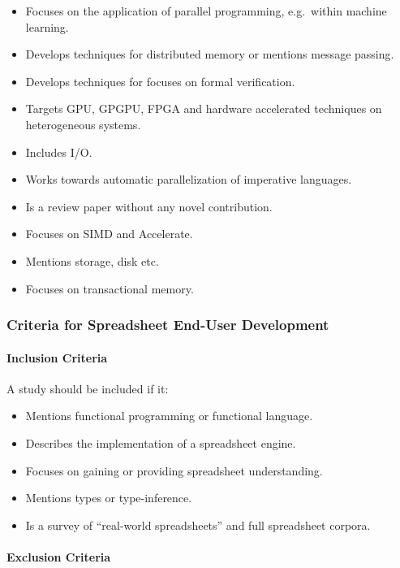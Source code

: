 \documentclass[a4paper]{article}
\begin{document}
\begin{itemize}
\item Focuses on the application of parallel programming, e.g.\ within
  machine learning.
\item Develops techniques for distributed memory or mentions message
  passing.
\item Develops techniques for focuses on formal verification.
\item Targets GPU, GPGPU, FPGA and hardware accelerated techniques on
  heterogeneous systems.
\item Includes I/O.
\item Works towards automatic parallelization of imperative languages.
\item Is a review paper without any novel contribution.
\item Focuses on SIMD and Accelerate. 
\item Mentions storage, disk etc.
\item Focuses on transactional memory.
\end{itemize}

\subsubsection{Criteria for Spreadsheet End-User Development}
\label{sec:crit-spre-end}

\paragraph{Inclusion Criteria}

A study should be included if it:

\begin{itemize}
\item Mentions functional programming or functional language.
\item Describes the implementation of a spreadsheet engine.
\item Focuses on gaining or providing spreadsheet understanding.
\item Mentions types or type-inference.
\item Is a survey of ``real-world spreadsheets'' and full spreadsheet corpora.
\end{itemize}

\paragraph{Exclusion Criteria}
\end{document}
